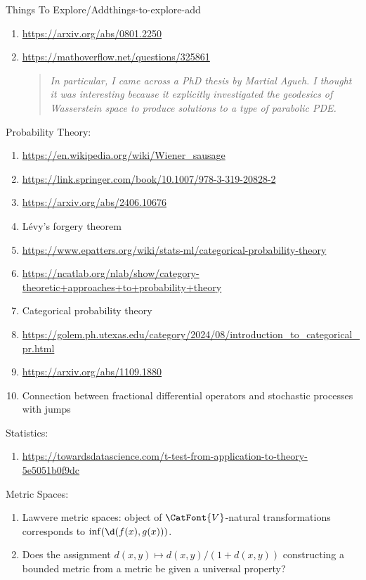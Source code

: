 \begin{remark}{Things To Explore/Add}{things-to-explore-add}
\begin{enumerate}
\begin{enumerate}
            \end{enumerate}
        \item \url{https://arxiv.org/abs/0801.2250}
        \item \url{https://mathoverflow.net/questions/325861}
            \begin{quote}
                \textit{In particular, I came across a PhD thesis by Martial Agueh. I thought it was interesting because it explicitly investigated the geodesics of Wasserstein space to produce solutions to a type of parabolic PDE.}
            \end{quote}
    \end{enumerate}
    Probability Theory:
    \begin{enumerate}
        \item \url{https://en.wikipedia.org/wiki/Wiener_sausage}
        \item \href{https://link.springer.com/book/10.1007/978-3-319-20828-2}{https://link.springer.com/book/10.1007/978-3-319-20828-2}
        \item \url{https://arxiv.org/abs/2406.10676}
        \item Lévy's forgery theorem
        \item \url{https://www.epatters.org/wiki/stats-ml/categorical-probability-theory}
        \item \url{https://ncatlab.org/nlab/show/category-theoretic+approaches+to+probability+theory}
        \item Categorical probability theory
        \item \url{https://golem.ph.utexas.edu/category/2024/08/introduction_to_categorical_pr.html}
        \item \url{https://arxiv.org/abs/1109.1880}
        \item Connection between fractional differential operators and stochastic processes with jumps
    \end{enumerate}
    Statistics:
    \begin{enumerate}
        \item \url{https://towardsdatascience.com/t-test-from-application-to-theory-5e5051b0f9dc}
    \end{enumerate}
    Metric Spaces:
    \begin{enumerate}
        \item Lawvere metric spaces: object of $\CatFont{V}$-natural transformations corresponds to $\inf(\d(f(x),g(x)))$.
        \item Does the assignment $d(x,y)\mapsto d(x,y)/(1+d(x,y))$ constructing a bounded metric from a metric be given a universal property?

\end{enumerate}
\end{remark}
